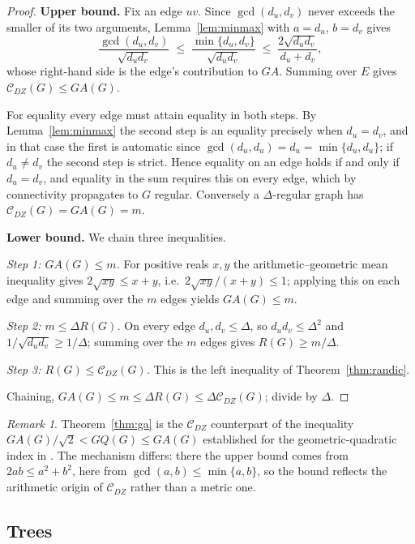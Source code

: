 \documentclass[11pt,a4paper]{article}
\theoremstyle{plain}
\theoremstyle{definition}
\theoremstyle{remark}
\newtheorem{remark}[theorem]{Remark}
\newcommand{\CDZ}{\mathcal{C}_{DZ}}
\newcommand{\gcdd}{\operatorname{gcd}}
\begin{document}
\begin{proof}
\textbf{Upper bound.} Fix an edge $uv$. Since $\gcdd(d_u,d_v)$ never exceeds the
smaller of its two arguments, Lemma~\ref{lem:minmax} with $a=d_u$, $b=d_v$ gives
\[
  \frac{\gcdd(d_u,d_v)}{\sqrt{d_ud_v}}
  \;\le\;\frac{\min\{d_u,d_v\}}{\sqrt{d_ud_v}}
  \;\le\;\frac{2\sqrt{d_ud_v}}{d_u+d_v},
\]
whose right-hand side is the edge's contribution to $GA$. Summing over $E$ gives
$\CDZ(G)\le GA(G)$.

For equality every edge must attain equality in both steps. By
Lemma~\ref{lem:minmax} the second step is an equality precisely when $d_u=d_v$,
and in that case the first is automatic since
$\gcdd(d_u,d_u)=d_u=\min\{d_u,d_u\}$; if $d_u\ne d_v$ the second step is strict.
Hence equality on an edge holds if and only if $d_u=d_v$, and equality in the sum
requires this on every edge, which by connectivity propagates to $G$ regular.
Conversely a $\Delta$-regular graph has $\CDZ(G)=GA(G)=m$.

\textbf{Lower bound.} We chain three inequalities.

\emph{Step 1: $GA(G)\le m$.} For positive reals $x,y$ the arithmetic--geometric
mean inequality gives $2\sqrt{xy}\le x+y$, i.e.\ $2\sqrt{xy}/(x+y)\le1$;
applying this on each edge and summing over the $m$ edges yields $GA(G)\le m$.

\emph{Step 2: $m\le\Delta R(G)$.} On every edge $d_u,d_v\le\Delta$, so
$d_ud_v\le\Delta^2$ and $1/\sqrt{d_ud_v}\ge1/\Delta$; summing over the $m$ edges
gives $R(G)\ge m/\Delta$.

\emph{Step 3: $R(G)\le\CDZ(G)$.} This is the left inequality of
Theorem~\ref{thm:randic}.

Chaining, $GA(G)\le m\le\Delta R(G)\le\Delta\CDZ(G)$; divide by $\Delta$.
\end{proof}

\begin{remark}
Theorem~\ref{thm:ga} is the $\CDZ$ counterpart of the inequality
$GA(G)/\sqrt2<GQ(G)\le GA(G)$ established for the geometric-quadratic index in
\cite{furtula2025ijmc}. The mechanism differs: there the upper bound comes from
$2ab\le a^2+b^2$, here from $\gcdd(a,b)\le\min\{a,b\}$, so the bound reflects the
arithmetic origin of $\CDZ$ rather than a metric one.
\end{remark}

\subsection{Trees}
\label{sec:trees}
\end{document}
